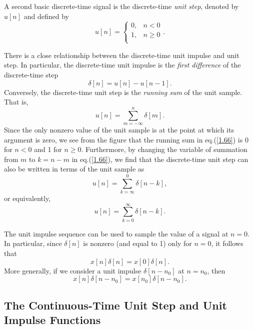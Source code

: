 \documentclass[a4paper,10pt,twoside]{book}
\begin{document}
A second basic discrete-time signal is the discrete-time \textit{unit step}, denoted by $u[n]$ and defined by
\begin{equation}
    \left.u[n] = \left\{\begin{array}{ll}{0,}&{n<0}\\{1,}&{n\geq0}\\\end{array}\right.\right..
    \label{1.64}
\end{equation}

There is a close relationship between the discrete-time unit impulse and unit step. In particular, the discrete-time unit impulse is the \textit{first difference} of the discrete-time step
\begin{equation}
    \delta[n]=u[n]-u[n-1].
    \label{1.65}
\end{equation}
Conversely, the discrete-time unit step is the \textit{running sum} of the unit sample. That is,
\begin{equation}
    u[n] = \sum_{m=-\infty}^{n}\delta[m].
    \label{1.66}
\end{equation}
Since the only nonzero value of the unit sample is at the point at which its argument is zero, we see from the figure that the running sum in eq.\;(\ref{1.66}) is 0 for $n<0$ and 1 for $n\ge 0$. Furthermore, by changing the variable of summation from $m$ to $k=n-m$ in eq.\;(\ref{1.66}), we find that the discrete-time unit step can also be written in terms of the unit sample as $$u[n]=\sum_{k=\infty}^{0}\delta[n-k],$$ or equivalently,
\begin{equation}
    u[n] = \sum_{k=0}^{\infty}\delta[n-k].
    \label{1.67}
\end{equation}

The unit impulse sequence can be used to sample the value of a signal at $n=0$. In particular, since $\delta[n]$ is nonzero (and equal to 1) only for $n=0$, it follows that
\begin{equation}
    x[n]\delta[n]=x[0]\delta[n].
    \label{1.68}
\end{equation}
More generally, if we consider a unit impulse $\delta[n-n_0]$ at $n=n_0$, then
\begin{equation}
    x[n]\delta[n-n_0]=x[n_0]\delta[n-n_0].
    \label{1.69}
\end{equation}

\subsection{The Continuous-Time Unit Step and Unit Impulse Functions}
\label{section:1.4.2}
\end{document}
